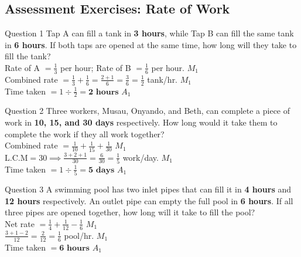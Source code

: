 \documentclass[12pt, a4paper, oneside]{article}
\begin{document}
\subsection*{Assessment Exercises: Rate of Work}

\begin{solvingbox}{Question 1}
Tap A can fill a tank in \textbf{3 hours}, while Tap B can fill the same tank in \textbf{6 hours}. If both taps are opened at the same time, how long will they take to fill the tank? \\
Rate of A $= \frac{1}{3}$ per hour; Rate of B $= \frac{1}{6}$ per hour. \hfill $M_1$ \\
Combined rate $= \frac{1}{3} + \frac{1}{6} = \frac{2+1}{6} = \frac{3}{6} = \frac{1}{2}$ tank/hr. \hfill $M_1$ \\
Time taken $= 1 \div \frac{1}{2} = \mathbf{2\text{ hours}}$ \hfill $A_1$
\end{solvingbox}

\begin{solvingbox}{Question 2}
Three workers, Musau, Onyando, and Beth, can complete a piece of work in \textbf{10, 15, and 30 days} respectively. How long would it take them to complete the work if they all work together? \\
Combined rate $= \frac{1}{10} + \frac{1}{15} + \frac{1}{30}$ \hfill $M_1$ \\
$\text{L.C.M} = 30 \implies \frac{3+2+1}{30} = \frac{6}{30} = \frac{1}{5}$ work/day. \hfill $M_1$ \\
Time taken $= 1 \div \frac{1}{5} = \mathbf{5\text{ days}}$ \hfill $A_1$
\end{solvingbox}

\begin{solvingbox}{Question 3}
A swimming pool has two inlet pipes that can fill it in \textbf{4 hours} and \textbf{12 hours} respectively. An outlet pipe can empty the full pool in \textbf{6 hours}. If all three pipes are opened together, how long will it take to fill the pool? \\
Net rate $= \frac{1}{4} + \frac{1}{12} - \frac{1}{6}$ \hfill $M_1$ \\
$\frac{3+1-2}{12} = \frac{2}{12} = \frac{1}{6}$ pool/hr. \hfill $M_1$ \\
Time taken $= \mathbf{6\text{ hours}}$ \hfill $A_1$
\end{solvingbox}
\end{document}
